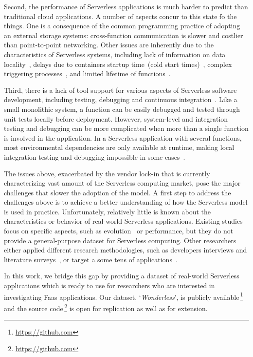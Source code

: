 Second, the performance of Serverless applications is much harder to 
predict than traditional cloud applications. A number of aspects concur 
to this state fo the things.
One is a consequence of the common programming practice
of adopting an external storage systems: cross-function communication 
is slower and costlier than point-to-point networking.
Other issues are inherently due to the characteristics of Serverless systems,
including lack of information on data locality~\cite{DBLP:journals/corr/abs-1902-03383},
delays due to containers startup time~(cold start times)~\cite{manner2018cold}, 
complex triggering processes~\cite{pelle2019towards}, and
limited lifetime of functions~\cite{hellerstein2018serverless}.

Third, there is a lack of tool support for various aspects of
Serverless software development, including testing, debugging 
and continuous integration~\cite{lenarduzzi2020serverless, nupponen2020serverless}.
Like a small monolithic system, a function can be easily debugged 
and tested through unit tests locally before deployment. 
However, system-level and integration testing and debugging can 
be more complicated when more than a single function is involved 
in the application. In a Serverless application with several functions, 
most environmental dependencies are only available at runtime, 
making local integration testing and debugging impossible in 
some cases~\cite{leitner2019mixed}.


The issues above, exacerbated by the vendor lock-in that is currently 
characterizing vast amount of the Serverless computing market, 
pose the major challenges that slower the adoption of the \faas model. 
A first step to address the challenges above is to achieve a 
better understanding of how the Serverless model is used in practice. 
Unfortunately, relatively little is known about the characteristics 
or behavior of real-world Serverless applications. Existing studies focus 
on specific aspects, such as evolution~\cite{spillner2019quantitative} 
or performance\cite{wang2018peeking,lloyd2018serverless},
but they do not provide a general-purpose dataset for Serverless computing.
Other researchers either applied different research methodologies, 
such as developers interviews and literature surveys~\cite{leitner2019mixed},
or target a some tens of applications~\cite{eismann2020serverless}.


In this work, we bridge this gap by providing a dataset of real-world Serverless 
applications which is ready to use for researchers who are interested in investigating
Faas applications. Our dataset, `\emph{Wonderless}', is publicly 
available\,\footnote{\url{https://github.com}} 
and the source code\,\footnote{\url{https://github.com}} 
is open for replication as well as for extension.











